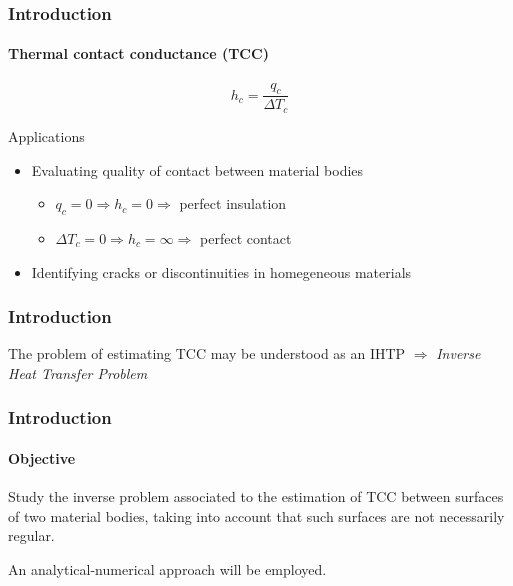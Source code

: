 \documentclass{beamer}
\begin{document}
\begin{frame}
	\frametitle{Introduction}
	\framesubtitle{Thermal contact conductance (TCC)}
	
	\begin{definition}{}
		\begin{equation*}
			h_c = \frac{q_c}{\Delta T_c}
		\end{equation*}
	\end{definition}
	
	\begin{alertblock}{Applications}
		\begin{itemize}
			\item Evaluating quality of contact between material bodies
			\begin{itemize}
				\item $q_c = 0 \Rightarrow h_c = 0 \Rightarrow$ perfect insulation
				\item $\Delta T_c = 0 \Rightarrow h_c = \infty \Rightarrow$ perfect contact
			\end{itemize}
			\item Identifying cracks or discontinuities in homegeneous materials
		\end{itemize}
	\end{alertblock}
\end{frame}
%
%
\begin{frame}
	\frametitle{Introduction}
	
	The problem of estimating TCC may be understood as an IHTP $\Rightarrow$ \textit{Inverse Heat Transfer Problem}
	
\end{frame}
%
\begin{frame}
	\frametitle{Introduction}
	\framesubtitle{Objective}
	\begin{alertblock}{}
		Study the inverse problem associated to the estimation of TCC between surfaces of two material bodies, taking into account that such surfaces are not necessarily regular.
		
		An analytical-numerical approach will be employed.
	\end{alertblock}
	\begin{center}
		
		
	\end{center}
\end{frame}
\end{document}
